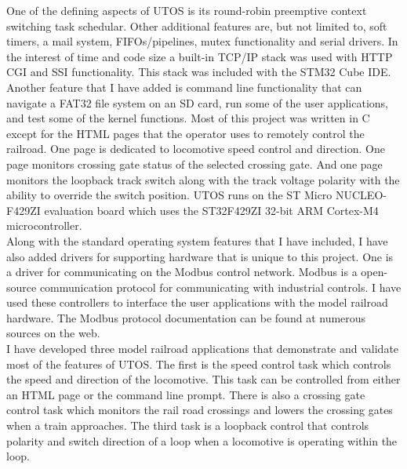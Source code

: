\documentclass[acmlarge,screen]{acmart}
\begin{document}
One of the defining aspects of UTOS is its round-robin preemptive context switching task schedular. Other additional features are, but not limited to, soft timers, a mail system, FIFOs/pipelines, mutex functionality and serial drivers. In the interest of time and code size a built-in TCP/IP stack was used with HTTP CGI and SSI functionality. This stack was included with the STM32 Cube IDE. Another feature that I have added is command line functionality that can navigate a FAT32 file system on an SD card, run some of the user applications, and test some of the kernel functions. Most of this project was written in C except for the HTML pages that the operator uses to remotely control the railroad. One page is dedicated to locomotive speed control and direction. One page monitors crossing gate status of the selected crossing gate. And one page monitors the loopback track switch along with the track voltage polarity with the ability to override the switch position. UTOS runs on the ST Micro NUCLEO-F429ZI evaluation board which uses the ST32F429ZI 32-bit ARM Cortex-M4 microcontroller.\\

Along with the standard operating system features that I have included, I have also added drivers for supporting hardware that is unique to this project. One is a driver for communicating on the Modbus control network. Modbus is a open-source communication protocol for communicating with industrial controls. I have used these controllers to interface the user applications with the model railroad hardware. The Modbus protocol documentation can be found at numerous sources on the web.\\

I have developed three model railroad applications that demonstrate and validate most of the features of UTOS. The first is the speed control task which controls the speed and direction of the locomotive. This task can be controlled from either an HTML page or the command line prompt. There is also a crossing gate control task which monitors the rail road crossings and lowers the crossing gates when a train approaches. The third task is a loopback control that controls polarity and switch direction of a loop when a locomotive is operating within the loop.
\end{document}
